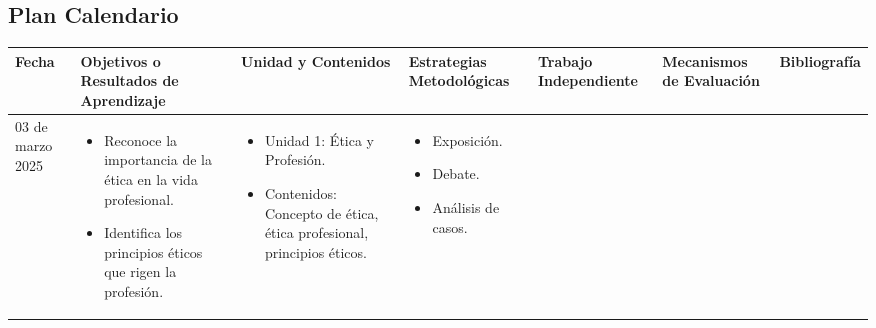 \begin{landscape}
    \section{Plan Calendario}

    \begin{adjustbox}{width=1.3847\textwidth}
        \begin{tabular}{ | p{3cm} | p{5cm} | p{5cm} | p{3cm} | p{3cm} | p{3cm} | p{5cm} | }
            \hline
            \textbf{Fecha}            & \textbf{Objetivos o Resultados de Aprendizaje} & \textbf{Unidad y Contenidos} & \textbf{Estrategias Metodológicas} & \textbf{Trabajo Independiente} & \textbf{Mecanismos de Evaluación} & \textbf{Bibliografía} \\
            \hline
            03 de marzo 2025          &
            \begin{minipage}
                [t]{5cm}
                \begin{itemize}[leftmargin=10pt]
                    \item Reconoce la importancia de la ética en la vida profesional.
                    \item Identifica los principios éticos que rigen la profesión.
                \end{itemize}
                \vspace{0.2cm}
            \end{minipage} &
            \begin{minipage}
                [t]{5cm}
                \begin{itemize}[leftmargin=10pt]
                    \item Unidad 1: Ética y Profesión.
                    \item Contenidos: Concepto de ética, ética profesional, principios éticos.
                \end{itemize}
                \vspace{0.2cm}
            \end{minipage} &
            \begin{minipage}
                [t]{3cm}
                \begin{itemize}[leftmargin=10pt]
                    \item Exposición.
                    \item Debate.
                    \item Análisis de casos.

\end{itemize}
\end{minipage}
\end{tabular}
\end{adjustbox}
\end{landscape}
